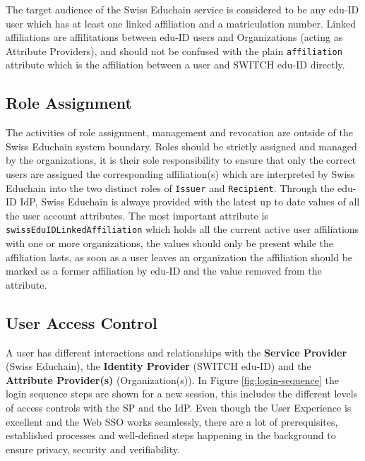 The target audience of the Swiss Educhain service is considered to be any edu-ID user which has at least one linked affiliation and a matriculation number. Linked affiliations are affilitations between edu-ID users and Organizations (acting as Attribute Providers), and should not be confused with the plain \texttt{affiliation} attribute which is the affiliation between a user and SWITCH edu-ID directly. 

\subsection{Role Assignment} \label{ssec:iam-role-assignment}

The activities of role assignment, management and revocation are outside of the Swiss Educhain system boundary. Roles should be strictly assigned and managed by the organizations, it is their sole responsibility to ensure that only the correct users are assigned the corresponding affiliation(s) which are interpreted by Swiss Educhain into the two distinct roles of \texttt{Issuer} and \texttt{Recipient}. Through the edu-ID IdP, Swiss Educhain is always provided with the latest up to date values of all the user account attributes. The most important attribute is \texttt{swissEduIDLinkedAffiliation} which holds all the current active user affiliations with one or more organizations, the values should only be present while the affiliation lasts, as soon as a user leaves an organization the affiliation should be marked as a former affiliation by edu-ID and the value removed from the attribute.

\subsection{User Access Control} \label{ssec:iam-access-control}

A user has different interactions and relationships with the \textbf{Service Provider} (Swiss Educhain), the \textbf{Identity Provider} (SWITCH edu-ID) and the \textbf{Attribute Provider(s)} (Organization(s)). In Figure \ref{fig:login-sequence} the login sequence steps are shown for a new session, this includes the different levels of access controls with the SP and the IdP. Even though the User Experience is excellent and the Web SSO works seamlessly, there are a lot of prerequisites, established processes and well-defined steps happening in the background to ensure privacy, security and verifiability.

